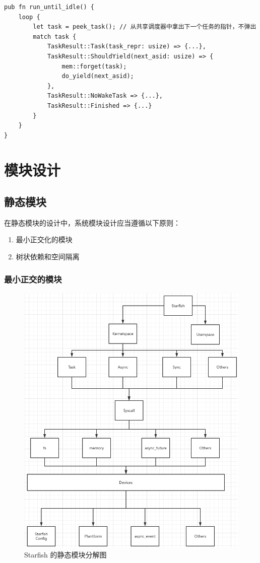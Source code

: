 \begin{lstlisting}[caption=用户执行器的设计]
pub fn run_until_idle() {
    loop {
        let task = peek_task(); // 从共享调度器中拿出下一个任务的指针，不弹出
        match task {
            TaskResult::Task(task_repr: usize) => {...},
            TaskResult::ShouldYield(next_asid: usize) => {
                mem::forget(task);
                do_yield(next_asid);
            },
            TaskResult::NoWakeTask => {...},
            TaskResult::Finished => {...}
        }
    }
}
\end{lstlisting}

\section{模块设计}

\subsection{静态模块}

在静态模块的设计中，系统模块设计应当遵循以下原则：

\begin{enumerate}
    \item 最小正交化的模块
    \item 树状依赖和空间隔离
\end{enumerate}

\subsubsection{最小正交的模块}


\begin{figure}[htb]
    \figureCapSet
    \centering
    \includegraphics[width=.8\linewidth]{figure/c3/starfishstructure.png}
    \caption{Starfish 的静态模块分解图}
    \label{figure:c3starfishstructure}
\end{figure}

